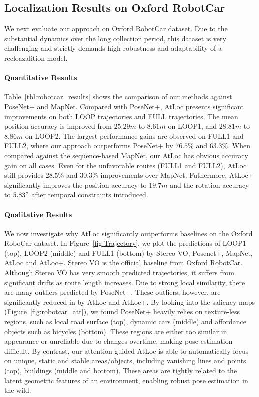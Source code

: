 \documentclass[letterpaper]{article}
\begin{document}
\subsection{Localization Results on Oxford RobotCar}
We next evaluate our approach on Oxford RobotCar dataset. Due to the substantial dynamics over the long collection period, this dataset is very challenging and strictly demands high robustness and adaptability of a recloazalition model. 

\paragraph{Quantitative Results} Table~\ref{tbl:robotcar_results} shows the comparison of our methods against PoseNet+ and MapNet. Compared with PoseNet+, AtLoc presents significant improvements on both LOOP trajectories and FULL trajectories. The mean position accuracy is improved from $25.29m$ to $8.61m$ on LOOP1, and $28.81m$ to $8.86m$ on LOOP2.
The largest performance gains are observed on FULL1 and FULL2, where our approach outperforms PoseNet+ by $76.5\%$ and $63.3\%$. When compared against the sequence-based MapNet, our AtLoc has obvious accuracy gain on all cases. Even for the unfavorable routes (FULL1 and FULL2), AtLoc still provides $28.5\%$ and $30.3\%$ improvements over MapNet. Futhermore, AtLoc+ significantly improves the position accuracy to $19.7m$ and the rotation accuracy to $5.83\degree$ after temporal constraints introduced.
\vspace{-0.2cm}

\paragraph{Qualitative Results} 
We now investigate why AtLoc significantly outperforms baselines on the Oxford RoboCar dataset.
In Figure~\ref{fig:Trajectory}, we plot the predictions of LOOP1 (top), LOOP2 (middle) and FULL1 (bottom) by Stereo VO, Posenet+, MapNet, AtLoc and AtLoc+. Stereo VO is the official baseline from Oxford RobotCar. Although Stereo VO has very smooth predicted trajectories, it suffers from significant drifts as route length increases. Due to strong local similarity, there are many outliers predicted by PoseNet+. These outliers, however, are significantly reduced in by AtLoc and AtLoc+.
By looking into the saliency maps (Figure~\ref{fig:robotcar_att}), we found PoseNet+ heavily relies on texture-less regions, such as local road surface (top), dynamic cars (middle) and affordance objects such as bicycles (bottom). These regions are either too similar in appearance or unreliable due to changes overtime, making pose estimation difficult. By contrast, our attention-guided AtLoc is able to automatically focus on unique, static and stable areas/objects, including vanishing lines and points (top), buildings (middle and bottom). These areas are tightly related to the latent geometric features of an environment, enabling robust pose estimation in the wild. 
\end{document}
